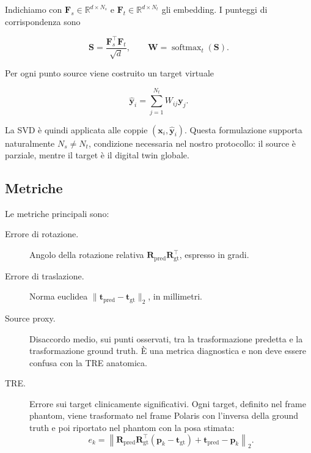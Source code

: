 \documentclass[11pt,a4paper]{article}
\newcommand{\R}{\mathbf{R}}
\newcommand{\tvec}{\mathbf{t}}
\newcommand{\x}{\mathbf{x}}
\newcommand{\y}{\mathbf{y}}
\begin{document}
Indichiamo con $\mathbf{F}_s\in\mathbb{R}^{d\times N_s}$ e
$\mathbf{F}_t\in\mathbb{R}^{d\times N_t}$ gli embedding. I punteggi di
corrispondenza sono

\begin{equation}
    \mathbf{S}=\frac{\mathbf{F}_s^\top\mathbf{F}_t}{\sqrt{d}},
    \qquad
    \mathbf{W}=\operatorname{softmax}_{t}(\mathbf{S}).
\end{equation}

Per ogni punto source viene costruito un target virtuale

\begin{equation}
    \widehat{\y}_i=\sum_{j=1}^{N_t}W_{ij}\y_j.
\end{equation}

La SVD è quindi applicata alle coppie $(\x_i,\widehat{\y}_i)$. Questa
formulazione supporta naturalmente $N_s\neq N_t$, condizione necessaria nel
nostro protocollo: il source è parziale, mentre il target è il digital twin
globale.

\subsection{Metriche}

Le metriche principali sono:

\begin{description}
    \item[Errore di rotazione.] Angolo della rotazione relativa
    $\R_{\mathrm{pred}}\R_{\mathrm{gt}}^\top$, espresso in gradi.
    \item[Errore di traslazione.] Norma euclidea
    $\|\tvec_{\mathrm{pred}}-\tvec_{\mathrm{gt}}\|_2$, in millimetri.
    \item[Source proxy.] Disaccordo medio, sui punti osservati, tra la
    trasformazione predetta e la trasformazione ground truth. È una metrica
    diagnostica e non deve essere confusa con la TRE anatomica.
    \item[TRE.] Errore sui target clinicamente significativi. Ogni target,
    definito nel frame phantom, viene trasformato nel frame Polaris con
    l'inversa della ground truth e poi riportato nel phantom con la posa
    stimata:
    \begin{equation}
        e_k=\left\|
        \R_{\mathrm{pred}}
        \R_{\mathrm{gt}}^\top(\mathbf{p}_k-\tvec_{\mathrm{gt}})
        +\tvec_{\mathrm{pred}}-\mathbf{p}_k
        \right\|_2.
    \end{equation}
\end{description}
\end{document}
